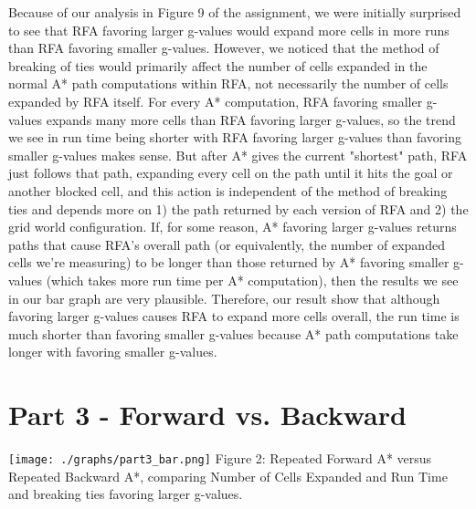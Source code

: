 \documentclass[10pt,a4paper]{article}
\begin{document}
Because of our analysis in Figure 9 of the assignment, we were initially surprised to see that RFA favoring larger g-values would expand more cells in more runs than RFA favoring smaller g-values. However, we noticed that the method of breaking of ties would primarily affect the number of cells expanded in the normal A* path computations within RFA, not necessarily the number of cells expanded by RFA itself. For every A* computation, RFA favoring smaller g-values expands many more cells than RFA favoring larger g-values, so the trend we see in run time being shorter with RFA favoring larger g-values than favoring smaller g-values makes sense. But after A* gives the current "shortest" path, RFA just follows that path, expanding every cell on the path until it hits the goal or another blocked cell, and this action is independent of the method of breaking ties and depends more on 1) the path returned by each version of RFA and 2) the grid world configuration. If, for some reason, A* favoring larger g-values returns paths that cause RFA's overall path (or equivalently, the number of expanded cells we're measuring) to be longer than those returned by A* favoring smaller g-values (which takes more run time per A* computation), then the results we see in our bar graph are very plausible. Therefore, our result show that although favoring larger g-values causes RFA to expand more cells overall, the run time is much shorter than favoring smaller g-values because A* path computations take longer with favoring smaller g-values.
\section*{Part 3 - Forward vs. Backward}
\begin{center}
\texttt{[image: ./graphs/part3\_bar.png]}
\newline
Figure 2: Repeated Forward A* versus Repeated Backward A*, comparing Number of Cells Expanded and Run Time and breaking ties favoring larger g-values.
\newline
\end{center}
\end{document}
